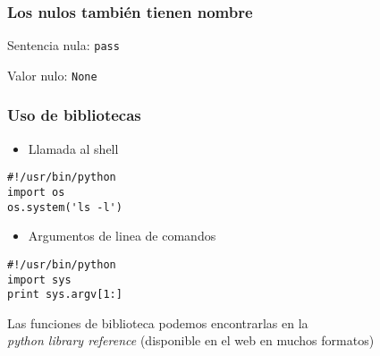 \begin{frame}[fragile]
\frametitle{Los nulos también tienen nombre}
 
Sentencia nula: \verb|pass|

Valor nulo: \verb|None| 

\end{frame}


\begin{frame}[fragile]
\frametitle{Uso de bibliotecas}



\begin{itemize}
\item  Llamada al shell
\end{itemize}


  \begin{footnotesize}
\begin{verbatim}
#!/usr/bin/python
import os
os.system('ls -l')
\end{verbatim}
  \end{footnotesize}

\begin{itemize}
\item Argumentos de linea de comandos
\end{itemize}



  \begin{footnotesize}
\begin{verbatim}
#!/usr/bin/python
import sys
print sys.argv[1:]

\end{verbatim}
  \end{footnotesize}
Las funciones de biblioteca podemos encontrarlas
en la \\\emph{python library reference}
(disponible en el web en muchos formatos)
\end{frame}











